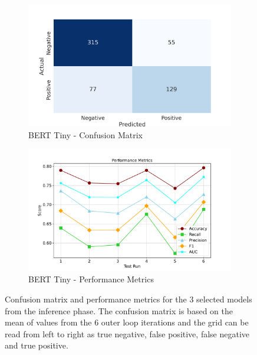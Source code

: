 \begin{figure}[!ht]
    \begin{subfigure}{0.45\linewidth}
        \includegraphics[width=\linewidth]{figures/confusion_berttiny.png}
        \caption{BERT Tiny - Confusion Matrix}
    \end{subfigure}
    \hfil
    \begin{subfigure}{0.45\linewidth}
        \includegraphics[width=\linewidth]{figures/metrics_line_berrttiny.pdf}
        \caption{BERT Tiny - Performance Metrics}
    \end{subfigure}
    \caption{Confusion matrix and performance metrics for the 3 selected models from the inference phase. The confusion matrix is based on the mean of values from the 6 outer loop iterations and the grid can be read from left to right as true negative, false positive, false negative and true positive.}
    \label{fig: deep_dive_results}
\end{figure}

